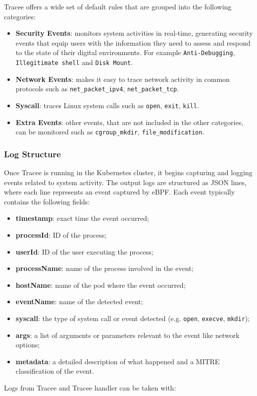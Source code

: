 Tracee offers a wide set of default rules\cite{traceeRules} that are grouped into the following categories:
\begin{itemize}
    \item \textbf{Security Events}: monitors system activities in real-time, generating security events that equip users with the information they need to assess and respond to the state of their digital environments. For example \texttt{Anti-Debugging}, \texttt{Illegitimate shell} and \texttt{Disk Mount}.
    \item \textbf{Network Events}: makes it easy to trace network activity in common protocols such as \texttt{net\_packet\_ipv4}, \texttt{net\_packet\_tcp}.
    \item \textbf{Syscall}: traces Linux system calls such as \texttt{open}, \texttt{exit}, \texttt{kill}.
    \item \textbf{Extra Events}: other events, that are not included in the other categories, can be monitored such as \texttt{cgroup\_mkdir}, \texttt{file\_modification}.
\end{itemize}


\subsubsection{Log Structure}
Once Tracee is running in the Kubernetes cluster, it begins capturing and logging events related to system activity. The output logs are structured as JSON lines, where each line represents an event captured by eBPF. Each event typically contains the following fields:
\begin{itemize}
    \item \textbf{timestamp}: exact time the event occurred;
    \item \textbf{processId}: ID of the process;
    \item \textbf{userId}: ID of the user executing the process;
    \item \textbf{processName}: name of the process involved in the event;
    \item \textbf{hostName}: name of the pod where the event occurred;
    \item \textbf{eventName}: name of the detected event;
    \item \textbf{syscall}: the type of system call or event detected (e.g. \texttt{open}, \texttt{execve}, \texttt{mkdir});
    \item \textbf{args}: a list of arguments or parameters relevant to the event like network options;
    \item \textbf{metadata}: a detailed description of what happened and a MITRE classification of the event.
\end{itemize}
Logs from Tracee and Tracee handler can be taken with:

